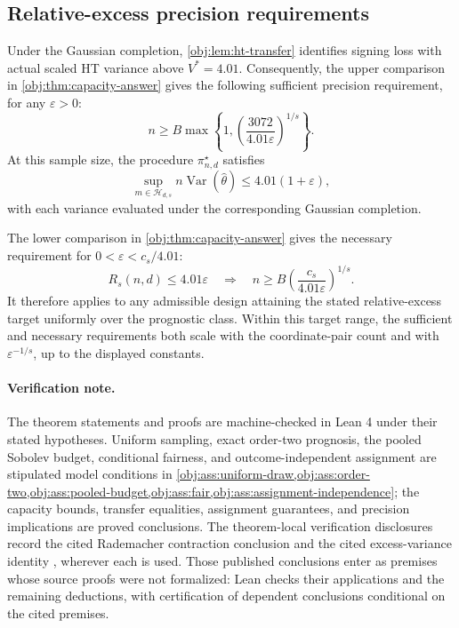 \documentclass[11pt]{article}
\begin{document}
\subsection{Relative-excess precision requirements}

Under the Gaussian completion, \cref{obj:lem:ht-transfer} identifies signing loss with actual scaled HT variance above \(V^*=4.01\). Consequently, the upper comparison in \cref{obj:thm:capacity-answer} gives the following sufficient precision requirement, for any \(\varepsilon>0\):
\[
n\geq B\max\left\{
1,\left(\frac{3072}{4.01\varepsilon}\right)^{1/s}
\right\}.
\]
At this sample size, the procedure \(\pi^\star_{n,d}\) satisfies
\[
\sup_{m\in\mathcal H_{d,s}}
n\operatorname{Var}(\widehat\theta)
\leq4.01(1+\varepsilon),
\]
with each variance evaluated under the corresponding Gaussian completion.

The lower comparison in \cref{obj:thm:capacity-answer} gives the necessary requirement for \(0<\varepsilon<c_s/4.01\):
\[
R_s(n,d)\leq4.01\varepsilon
\quad\Longrightarrow\quad
n\geq B\left(\frac{c_s}{4.01\varepsilon}\right)^{1/s}.
\]
It therefore applies to any admissible design attaining the stated relative-excess target uniformly over the prognostic class. Within this target range, the sufficient and necessary requirements both scale with the coordinate-pair count and with \(\varepsilon^{-1/s}\), up to the displayed constants.

\paragraph{Verification note.}
The theorem statements and proofs are machine-checked in Lean 4 under their stated hypotheses. Uniform sampling, exact order-two prognosis, the pooled Sobolev budget, conditional fairness, and outcome-independent assignment are stipulated model conditions in \cref{obj:ass:uniform-draw,obj:ass:order-two,obj:ass:pooled-budget,obj:ass:fair,obj:ass:assignment-independence}; the capacity bounds, transfer equalities, assignment guarantees, and precision implications are proved conclusions. The theorem-local verification disclosures record the cited Rademacher contraction conclusion \citep[Theorem 12(4), with Rademacher complexity as in Definition 2]{BartlettMendelson2002Complexities} and the cited excess-variance identity \citep[Proposition 2.3, equation (2.4), under Assumption 2.1 and Definition 2.2]{Cytrynbaum2026Limits}, wherever each is used. Those published conclusions enter as premises whose source proofs were not formalized: Lean checks their applications and the remaining deductions, with certification of dependent conclusions conditional on the cited premises.
\end{document}
